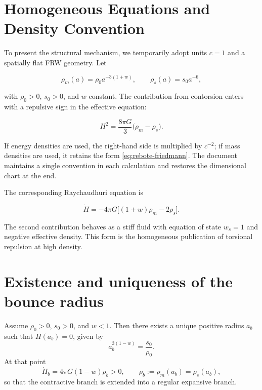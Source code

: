 \section{Homogeneous Equations and Density Convention}

To present the structural mechanism, we temporarily adopt units
\(c=1\) and a spatially flat FRW geometry.  Let

\begin{equation}
 \rho_m(a)=\rho_0a^{-3(1+w)},
 \qquad
 \rho_s(a)=s_0a^{-6},
 \label{eq:rebote-densities}
\end{equation}

with \(\rho_0>0\), \(s_0>0\), and \(w\) constant.  The contribution from
contorsion enters with a repulsive sign in the effective equation:

\begin{equation}
 H^2=\frac{8\pi G}{3}\bigl(\rho_m-\rho_s\bigr).
 \label{eq:rebote-friedmann}
\end{equation}

If energy densities are used, the right-hand side is multiplied by
\(c^{-2}\); if mass densities are used, it retains the form
\cref{eq:rebote-friedmann}.  The document maintains a single convention in
each calculation and restores the dimensional chart at the end.

The corresponding Raychaudhuri equation is

\begin{equation}
 \dot H=-4\pi G\bigl[(1+w)\rho_m-2\rho_s\bigr].
 \label{eq:rebote-raychaudhuri}
\end{equation}

The second contribution behaves as a stiff fluid with equation of
state \(w_s=1\) and negative effective density. This form is the homogeneous
publication of torsional repulsion at high density.

\section{Existence and uniqueness of the bounce radius}

\begin{theorem}
Assume \(\rho_0>0\), \(s_0>0\), and \(w<1\).  Then there exists a unique
positive radius \(a_b\) such that \(H(a_b)=0\), given by
\begin{equation}
 \boxed{
 a_b^{3(1-w)}=\frac{s_0}{\rho_0}.}
 \label{eq:rebote-radius}
\end{equation}
At that point
\begin{equation}
 \boxed{
 \dot H_b=4\pi G(1-w)\rho_b>0,}
 \qquad
 \rho_b:=\rho_m(a_b)=\rho_s(a_b),
 \label{eq:rebote-positive-derivative}
\end{equation}
so that the contractive branch is extended into a regular expansive branch.
\end{theorem}

